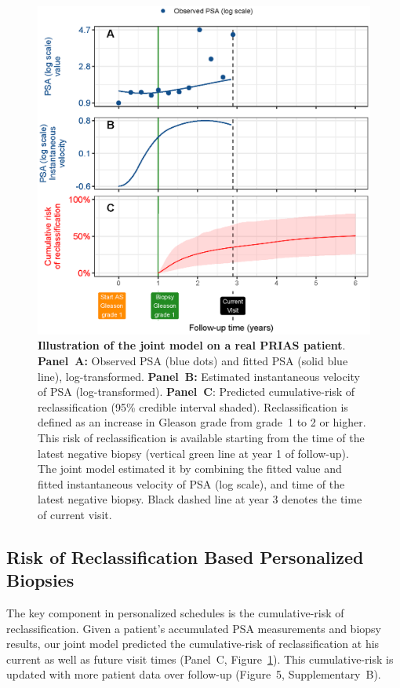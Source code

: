 \begin{figure}
\centerline{\includegraphics[width=\columnwidth]{images/jmExplanationPlot_113.eps}}
\caption{\textbf{Illustration of the joint model on a real PRIAS patient}. \textbf{Panel~A:} Observed PSA (blue dots) and fitted PSA (solid blue line), log-transformed. \textbf{Panel~B:} Estimated instantaneous velocity of PSA (log-transformed). \textbf{Panel~C}: Predicted cumulative-risk of reclassification (95\% credible interval shaded). Reclassification is defined as an increase in Gleason grade from grade~1 to 2 or higher. This risk of reclassification is available starting from the time of the latest negative biopsy (vertical green line at year 1 of follow-up). The joint model estimated it by combining the fitted value and fitted instantaneous velocity of PSA (log scale), and time of the latest negative biopsy. Black dashed line at year 3 denotes the time of current visit.}
\label{fig:jmExplanationPlot_113}
\end{figure}

\subsection{Risk of Reclassification Based Personalized Biopsies}
The key component in personalized schedules is the cumulative-risk of reclassification. Given a patient's accumulated PSA measurements and biopsy results, our joint model predicted the cumulative-risk of reclassification at his current as well as future visit times (Panel~C, Figure~\ref{fig:jmExplanationPlot_113}). This cumulative-risk is updated with more patient data over follow-up (Figure~5, Supplementary~B).


